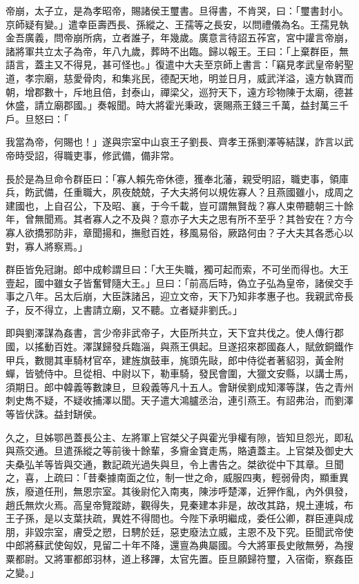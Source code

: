 \begin{pinyinscope}
帝崩，太子立，是為孝昭帝，賜諸侯王璽書。旦得書，不肯哭，曰：「璽書封小。京師疑有變。」遣幸臣壽西長、孫縱之、王孺等之長安，以問禮儀為名。王孺見執金吾廣義，問帝崩所病，立者誰子，年幾歲。廣意言待詔五莋宮，宮中讙言帝崩，諸將軍共立太子為帝，年八九歲，葬時不出臨。歸以報王。王曰：「上棄群臣，無語言，蓋主又不得見，甚可怪也。」復遣中大夫至京師上書言：「竊見孝武皇帝躬聖道，孝宗廟，慈愛骨肉，和集兆民，德配天地，明並日月，威武洋溢，遠方執寶而朝，增郡數十，斥地且倍，封泰山，禪梁父，巡狩天下，遠方珍物陳于太廟，德甚休盛，請立廟郡國。」奏報聞。時大將霍光秉政，褒賜燕王錢三千萬，益封萬三千戶。旦怒曰：「

我當為帝，何賜也！」遂與宗室中山哀王子劉長、齊孝王孫劉澤等結謀，詐言以武帝時受詔，得職吏事，修武備，備非常。

長於是為旦命令群臣曰：「寡人賴先帝休德，獲奉北藩，親受明詔，職吏事，領庫兵，飭武備，任重職大，夙夜兢兢，子大夫將何以規佐寡人？且燕國雖小，成周之建國也，上自召公，下及昭、襄，于今千載，豈可謂無賢哉？寡人束帶聽朝三十餘年，曾無聞焉。其者寡人之不及與？意亦子大夫之思有所不至乎？其咎安在？方今寡人欲撟邪防非，章聞揚和，撫慰百姓，移風易俗，厥路何由？子大夫其各悉心以對，寡人將察焉。」

群臣皆免冠謝。郎中成軫謂旦曰：「大王失職，獨可起而索，不可坐而得也。大王壹起，國中雖女子皆奮臂隨大王。」旦曰：「前高后時，偽立子弘為皇帝，諸侯交手事之八年。呂太后崩，大臣誅諸呂，迎立文帝，天下乃知非孝惠子也。我親武帝長子，反不得立，上書請立廟，又不聽。立者疑非劉氏。」

即與劉澤謀為姦書，言少帝非武帝子，大臣所共立，天下宜共伐之。使人傳行郡國，以搖動百姓。澤謀歸發兵臨淄，與燕王俱起。旦遂招來郡國姦人，賦斂銅鐵作甲兵，數閱其車騎材官卒，建旌旗鼓車，旄頭先敺，郎中侍從者著貂羽，黃金附蟬，皆號侍中。旦從相、中尉以下，勒車騎，發民會圍，大獵文安縣，以講士馬，須期日。郎中韓義等數諫旦，旦殺義等凡十五人。會缾侯劉成知澤等謀，告之青州刺史雋不疑，不疑收捕澤以聞。天子遣大鴻臚丞治，連引燕王。有詔弗治，而劉澤等皆伏誅。益封缾侯。

久之，旦姊鄂邑蓋長公主、左將軍上官桀父子與霍光爭權有隙，皆知旦怨光，即私與燕交通。旦遣孫縱之等前後十餘輩，多齎金寶走馬，賂遺蓋主。上官桀及御史大夫桑弘羊等皆與交通，數記疏光過失與旦，令上書告之。桀欲從中下其章。旦聞之，喜，上疏曰：「昔秦據南面之位，制一世之命，威服四夷，輕弱骨肉，顯重異族，廢道任刑，無恩宗室。其後尉佗入南夷，陳涉呼楚澤，近狎作亂，內外俱發，趙氏無炊火焉。高皇帝覽蹤跡，觀得失，見秦建本非是，故改其路，規土連城，布王子孫，是以支葉扶疏，異姓不得間也。今陛下承明繼成，委任公卿，群臣連與成朋，非毀宗室，膚受之愬，日騁於廷，惡吏廢法立威，主恩不及下究。臣聞武帝使中郎將蘇武使匈奴，見留二十年不降，還亶為典屬國。今大將軍長史敞無勞，為搜粟都尉。又將軍都郎羽林，道上移蹕，太官先置。臣旦願歸符璽，入宿衛，察姦臣之變。」


\end{pinyinscope}
